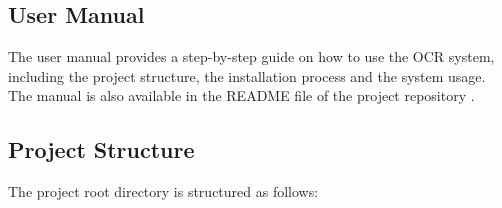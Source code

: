 \documentclass[12pt,twoside]{report}
\begin{document}
\begin{appendices}
\chapter{User Manual}
\label{app:user_manual}
The user manual provides a step-by-step guide on how to use the OCR system, including the project structure, the installation process and the system usage. The manual is also available in the README file of the project repository \cite{gitlab}.

\section{Project Structure}
\label{sec:project_structure}
The project root directory is structured as follows:


\end{appendices}
\end{document}
